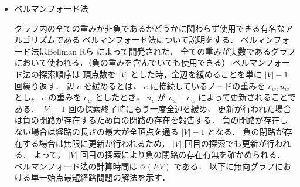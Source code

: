 \documentclass[12pt]{optlab-bachelor}
\begin{document}
\begin{itemize}
  \item ベルマンフォード法

  グラフ内の全ての重みが非負であるかどうかに関わらず使用できる有名なアルゴリズムである
  ベルマンフォード法について説明をする．
  ベルマンフォード法はBellman Rら \cite{Bellman}によって開発された．
  全ての重みが実数であるグラフにおいて使われる．（負の重みを含んでいても使用できる）
  ベルマンフォード法の探索順序は
  頂点数を $|V|$ とした時，全辺を緩めることを単に $|V|-1$ 回繰り返す．
  辺 $e$ を緩めるとは， $e$ に接続しているノードの重みを $v_w,u_w$ とし，
  $e$ の重みを $e_w$ としたとき， $u_v$ が $v_w+e_w$ によって更新されることである．
  $|V|-1$ 回の探索終了時にもう一度全辺を緩め，
  更新が行われた場合は負の閉路が存在するため負の閉路の存在を報告する．
  負の閉路が存在しない場合は経路の長さの最大が全頂点を通る $|V|-1$ となる．
  負の閉路が存在する場合は無限に更新が行われるため， $|V|$ 回目の探索でも更新が行われる．
  よって， $|V|$ 回目の探索により負の閉路の存在有無を確かめられる．
  ベルマンフォード法の計算時間は $\mathcal{\mathcal{O}}(EV)$ である．
  以下に無向グラフにおける単一始点最短経路問題の解法を示す．


\end{itemize}
\end{document}
